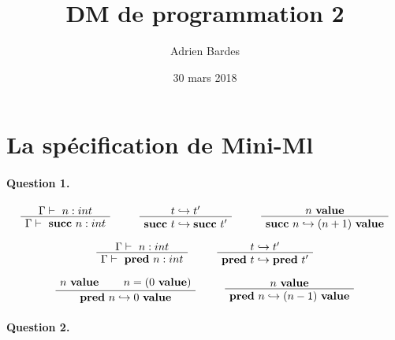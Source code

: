 \documentclass[12pt]{article}
\title{DM de programmation 2}
\author{Adrien Bardes}
\date{30 mars 2018}
\newenvironment{bprooftree}
  {\leavevmode\hbox\bgroup}
  {\DisplayProof\egroup}
\begin{document}
\maketitle

\section{La spécification de Mini-Ml}

\paragraph{Question 1.}

\[
\begin{bprooftree}
\AxiomC{$\Gamma \vdash\ n : int$}
\UnaryInfC{$\Gamma \vdash\ \textbf{succ} \ n : int$}
\end{bprooftree} \qquad
\begin{bprooftree}
\AxiomC{$t \hookrightarrow t^{\prime}$}
\UnaryInfC{$\textbf{succ} \ t \hookrightarrow \textbf{succ} \ t^{\prime}$}
\end{bprooftree} \qquad
\begin{bprooftree}
\AxiomC{$n \ \textbf{value}$}
\UnaryInfC{$\textbf{succ} \ n \hookrightarrow (n + 1) \ \textbf{value}$}
\end{bprooftree}
\]

\[
\begin{bprooftree}
\AxiomC{$\Gamma \vdash\ n : int$}
\UnaryInfC{$\Gamma \vdash\ \textbf{pred} \ n : int$}
\end{bprooftree} \qquad
\begin{bprooftree}
\AxiomC{$t \hookrightarrow t^{\prime}$}
\UnaryInfC{$\textbf{pred} \ t \hookrightarrow \textbf{pred} \ t^{\prime}$}
\end{bprooftree}
\]

\[
\begin{bprooftree}
\AxiomC{$n \ \textbf{value}$}
\AxiomC{$n = (0 \ \textbf{value})$}
\BinaryInfC{$\textbf{pred} \ n \hookrightarrow 0 \ \textbf{value}$}
\end{bprooftree} \qquad
\begin{bprooftree}
\AxiomC{$n \ \textbf{value}$}
\UnaryInfC{$\textbf{pred} \ n \hookrightarrow (n - 1) \ \textbf{value}$}
\end{bprooftree}
\]

\paragraph{Question 2.}
\end{document}

